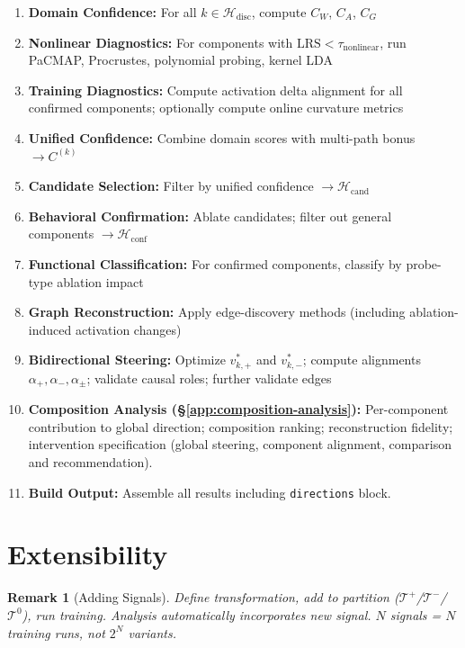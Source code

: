 \documentclass[11pt]{article}
\newtheorem{remark}{Remark}[section]
\begin{document}
\begin{enumerate}[nosep]
\item \textbf{Domain Confidence:} For all $k \in \mathcal{H}_{\text{disc}}$, compute $C_W$, $C_A$, $C_G$
\item \textbf{Nonlinear Diagnostics:} For components with $\text{LRS} < \tau_{\text{nonlinear}}$, run PaCMAP, Procrustes, polynomial probing, kernel LDA
\item \textbf{Training Diagnostics:} Compute activation delta alignment for all confirmed components; optionally compute online curvature metrics
\item \textbf{Unified Confidence:} Combine domain scores with multi-path bonus $\to C^{(k)}$
\item \textbf{Candidate Selection:} Filter by unified confidence $\to \mathcal{H}_{\text{cand}}$
\item \textbf{Behavioral Confirmation:} Ablate candidates; filter out general components $\to \mathcal{H}_{\text{conf}}$
\item \textbf{Functional Classification:} For confirmed components, classify by probe-type ablation impact
\item \textbf{Graph Reconstruction:} Apply edge-discovery methods (including ablation-induced activation changes)
\item \textbf{Bidirectional Steering:} Optimize $v^*_{k,+}$ and $v^*_{k,-}$; compute alignments $\alpha_+, \alpha_-, \alpha_\pm$; validate causal roles; further validate edges
\item[15.5] \textbf{Composition Analysis (\S\ref{app:composition-analysis}):} Per-component contribution to global direction; composition ranking; reconstruction fidelity; intervention specification (global steering, component alignment, comparison and recommendation).
\item \textbf{Build Output:} Assemble all results including \texttt{directions} block.
\end{enumerate}

\section{Extensibility}
\label{app:extensibility}

\begin{remark}[Adding Signals]
\label{rem:adding-signals}
Define transformation, add to partition ($\mathcal{T}^+$/$\mathcal{T}^-$/$\mathcal{T}^0$), run training. Analysis automatically incorporates new signal. $N$ signals = $N$ training runs, not $2^N$ variants.
\end{remark}
\end{document}
